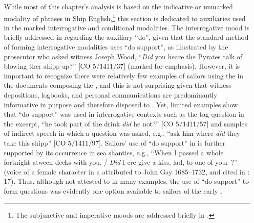 While most of this chapter’s analysis is based on the indicative or unmarked modality of  phrases in Ship English,\footnote{The subjunctive and imperative moods are addressed briefly in .} this section is dedicated to auxiliaries used in the marked interrogative and conditional modalities. The interrogative mood is briefly addressed in  regarding the auxiliary “do”, given that the standard method of forming interrogative modalities uses “do support”, as illustrated by the prosecutor who asked witness Joseph Wood, “\textit{Did} you heare the Pyrates talk of blowing ther shipp up?” [CO 5/1411/37] (marked for emphasis). However, it is important to recognize there were relatively few examples of sailors using the  in the documents composing the , and this is not surprising given that witness depositions, logbooks, and personal communications are predominantly informative in purpose and therefore disposed to . Yet, limited examples show that “do support” was used in interrogative contexts such as the tag question in the excerpt, “he took part of the drink \textit{did} he not?” [CO 5/1411/57] and samples of indirect speech in which a question was asked, e.g., “ask him where \textit{did} they take this shipp” [CO 5/1411/97]. Sailors’ use of “do support” in  is further supported by its occurrence in sea shanties, e.g., “When I passed a whole fortnight atween decks with you, / \textit{Did} I ere give a kiss, lad, to one of your ?” (voice of a female character in a  attributed to John Gay 1685–1732, and cited in \citealt{Hugill1969}: 17). Thus, although not attested to in many examples, the use of “do support” to form questions was evidently one option available to sailors of the early .   

